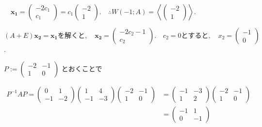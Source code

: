 \documentclass{jsarticle}
\begin{document}
\(\quad \bm{x_1}=\left(\begin{array}{c}-2 c_1 \\ c_1\end{array}\right)=c_1\left(\begin{array}{c}-2 \\ 1\end{array}\right). \quad \therefore W(-1 ; A)=\left\langle\left(\begin{array}{c}-2 \\ 1\end{array}\right)\right\rangle \).

\( (A+E) \bm{x_2}=\bm{x_1} を解くと, \quad \bm{x_2}=\left(\begin{array}{c}-2 c_2-1 \\ c_2\end{array}\right). \quad c_2=0 とすると,  \quad x_2=\left(\begin{array}{c}-1 \\ 0\end{array}\right) \).

$P:=\left(\begin{array}{cc}-2 & -1 \\ 1 & 0\end{array}\right)$ とおくことで


\( \begin{aligned} P^{-1} A P=\left(\begin{array}{cc}0 & 1 \\ -1 & -2\end{array}\right)\left(\begin{array}{cc}1 & 4 \\ -1 & -3\end{array}\right)\left(\begin{array}{rr}-2 & -1 \\ 1 & 0\end{array}\right) & =\left(\begin{array}{cc}-1 & -3 \\ 1 & 2\end{array}\right)\left(\begin{array}{cc}-2 & -1 \\ 1 & 0\end{array}\right) \\ & =\left(\begin{array}{cc}-1 & 1 \\ 0 & -1\end{array}\right)\end{aligned} \)
\end{document}

